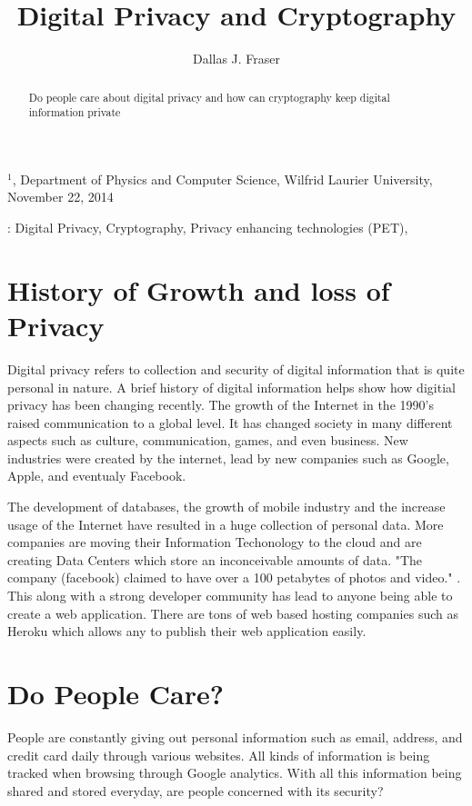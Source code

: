 \documentclass[12pt]{article}
\title{Digital Privacy and Cryptography}
\author{
	Dallas J. Fraser\inst{1}
}
\def\inst#1{$^{#1}$}
\begin{document}
\maketitle

\begin{center}
{\footnotesize

\inst{1}, Department of Physics and Computer Science, Wilfrid Laurier 
University, November 22, 2014}

\end{center}

\begin{abstract}
Do people care about digital privacy and how can cryptography keep digital information private
\end{abstract}

: Digital Privacy, Cryptography, Privacy enhancing technologies (PET),

\section{History of Growth and loss of Privacy}\label{sec:history}


Digital privacy refers to collection and security of digital information that is quite personal in nature. A brief history of digital information helps show how digitial privacy has been changing recently. The growth of the Internet in the 1990's raised communication to a global level. It has changed society in many different aspects such as culture, communication, games, and even business. New industries were created by the internet, lead by new companies such as Google, Apple, and eventualy Facebook.

The development of databases, the growth of mobile industry  and the increase usage of the Internet have resulted in a huge collection of personal data. More companies are moving their Information Techonology to the cloud and are creating Data Centers which store an inconceivable amounts of data. "The company (facebook) claimed to have over a 100 petabytes of photos and video." \cite{Wallbank}. This along with a strong developer community has lead to anyone being able to create a web application. There are tons of web based hosting companies such as Heroku which allows any to publish their web application easily.

\section{Do People Care?}\label{sec:demand}
People are constantly giving out personal information such as email, address, and credit card daily through various websites. All kinds of information is being tracked when browsing through Google analytics. With all this information being shared and stored everyday, are people concerned with its security?
\end{document}
